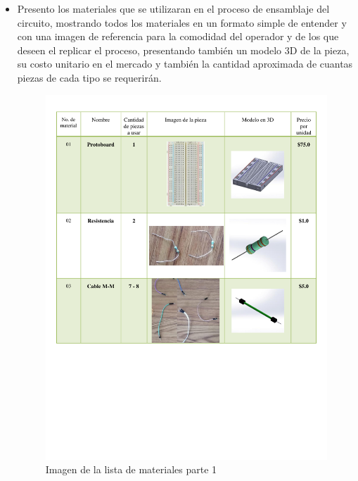     \begin{itemize}
        \item  Presento los materiales que se utilizaran en el proceso de ensamblaje del circuito, mostrando todos los materiales en un formato simple de entender y con una imagen de referencia para la comodidad del operador y de los que deseen el replicar el proceso, presentando también un modelo 3D de la pieza, su costo unitario en el mercado y también la cantidad aproximada de cuantas piezas de cada tipo se requerirán.
    
    \newpage
    
    \begin{figure}[H]
        \centering
        \includegraphics[trim = {1mm 1mm 1mm 1mm},clip,scale=0.5]{19/Img/listaDeMateriales 1.pdf}
        \caption{Imagen de la lista de materiales parte 1}
        \label{fig:lista1}
    \end{figure}
    

\end{itemize}
